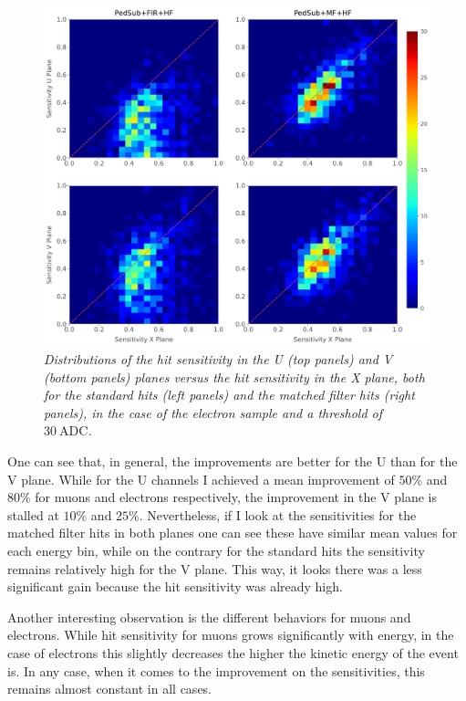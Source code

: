 \begin{figure}[t]
	\centering
	\includegraphics[width=.99\linewidth]{Images/Matched_Filter/hit_study_electron_concurrence}
	\caption{\textit{Distributions of the hit sensitivity in the U (top panels) and V (bottom panels) planes versus the hit sensitivity in the X plane, both for the standard hits (left panels) and the matched filter hits (right panels), in the case of the electron sample and a threshold of $30 \ \mathrm{ADC}$.}}
	\label{fig:electron_concurrence}
\end{figure}

One can see that, in general, the improvements are better for the U than for the V plane. While for the U channels I achieved a mean improvement of $50\%$ and $80\%$ for muons and electrons respectively, the improvement in the V plane is stalled at $10\%$ and $25\%$. Nevertheless, if I look at the sensitivities for the matched filter hits in both planes one can see these have similar mean values for each energy bin, while on the contrary for the standard hits the sensitivity remains relatively high for the V plane. This way, it looks there was a less significant gain because the hit sensitivity was already high.

Another interesting observation is the different behaviors for muons and electrons. While hit sensitivity for muons grows significantly with energy, in the case of electrons this slightly decreases the higher the kinetic energy of the event is. In any case, when it comes to the improvement on the sensitivities, this remains almost constant in all cases.

